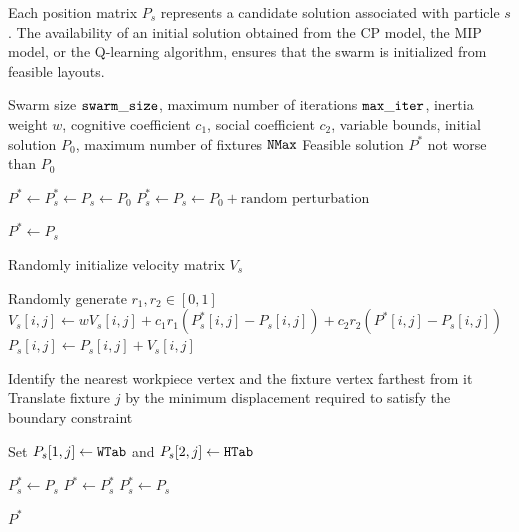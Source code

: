 Each position matrix $P_s$ represents a candidate solution associated with particle $s$. The availability of an initial solution obtained from the CP model, the MIP model, or the Q-learning algorithm, ensures that the swarm is initialized from feasible layouts.


\begin{algorithm}[htbp]
	\footnotesize
	\caption{Particle Swarm Optimization for Fixture Layout Optimization}
	\label{alg:pso_fixtures}
	\begin{algorithmic}[1]
		\Require Swarm size $\mathtt{swarm\_size}$, maximum number of iterations $\mathtt{max\_iter}$, inertia weight $w$, cognitive coefficient $c_1$,
		social coefficient $c_2$, variable bounds, initial solution $P_0$, maximum number of fixtures $\mathtt{NMax}$
		\Ensure Feasible solution $P^*$ not worse than $P_0$
		
		\label{alg:start_init}
		\State $P^* \gets P^*_s \gets P_s \gets P_0$
		\Else
		\State $P^*_s \gets P_s \gets P_0 + \text{random perturbation}$
		\EndIf
		\label{alg:end_init}
		
		\label{alg:start_init_eval}
		\State $P^*\gets P_s$
		\EndIf
		\EndIf
		\label{alg:end_init_eval}
		
		\State Randomly initialize velocity matrix $V_s$
		\EndFor
		
		\State Randomly generate $r_1,r_2\in[0,1]$
		\label{alg:start_pso_update}
		\State $V_s[i,j]\gets wV_s[i,j]+c_1r_1(P^*_s[i,j]-P_s[i,j])+c_2r_2(P^*[i,j]-P_s[i,j])$
		\State $P_s[i,j]\gets P_s[i,j]+V_s[i,j]$
		\label{alg:end_pso_update}
		\EndFor
		\EndFor
		
		\label{alg:start_fixing_geom}
		\State Identify the nearest workpiece vertex and the fixture vertex farthest from it
		\State Translate fixture $j$ by the minimum displacement required to satisfy the boundary constraint
		\label{alg:end_fixing_geom}
		\EndIf
		
		\label{alg:start_fixing_type}
		\State Set $P_s[1,j]\gets\mathtt{WTab}$ and $P_s[2,j]\gets\mathtt{HTab}$
		\EndIf
		\label{alg:end_fixing_type}
		\EndFor
	
		
		\label{alg:start_deb_eval}
		\State $P^*_s\gets P_s$
		\State $P^*\gets P^*_s$
		\EndIf
		\EndIf
		\State $P^*_s\gets P_s$
		\EndIf
		\label{alg:end_deb_eval}
		
		\EndFor
		\EndFor
		
		\State \Return $P^*$
		
	\end{algorithmic}
\end{algorithm}


